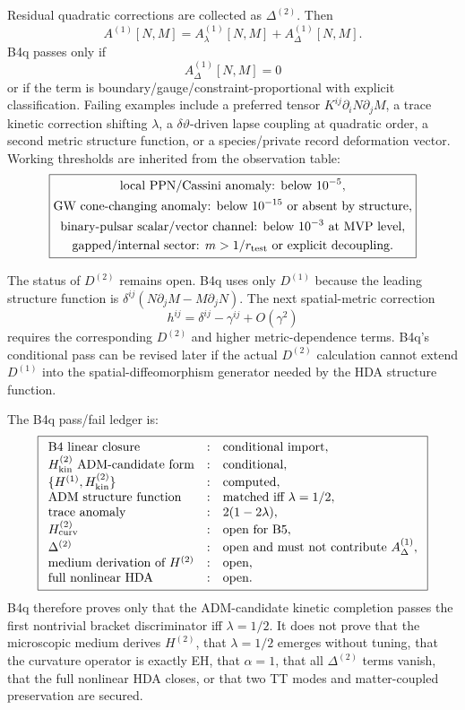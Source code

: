 \documentclass[11pt]{article}
\begin{document}
Residual quadratic corrections are collected as \(\Delta^{(2)}\).  Then
\[
\boxed{
A^{(1)}[N,M]=A_\lambda^{(1)}[N,M]+A_\Delta^{(1)}[N,M].
}
\]
B4q passes only if
\[
\boxed{A_\Delta^{(1)}[N,M]=0}
\]
or if the term is boundary/gauge/constraint-proportional with explicit
classification.  Failing examples include a preferred tensor
\(K^{ij}\partial_iN\partial_jM\), a trace kinetic correction shifting
\(\lambda\), a \(\delta\vartheta\)-driven lapse coupling at quadratic order, a
second metric structure function, or a species/private record deformation
vector.  Working thresholds are inherited from the observation table:
\[
\boxed{
\begin{gathered}
\text{local PPN/Cassini anomaly: below }10^{-5},\\
\text{GW cone-changing anomaly: below }10^{-15}\text{ or absent by structure},\\
\text{binary-pulsar scalar/vector channel: below }10^{-3}\text{ at MVP level},\\
\text{gapped/internal sector: }m>1/r_{\rm test}
\text{ or explicit decoupling.}
\end{gathered}}
\]

The status of \(D^{(2)}\) remains open.  B4q uses only \(D^{(1)}\) because the
leading structure function is \(\delta^{ij}(N\partial_jM-M\partial_jN)\).  The
next spatial-metric correction
\[
\boxed{h^{ij}=\delta^{ij}-\gamma^{ij}+O(\gamma^2)}
\]
requires the corresponding \(D^{(2)}\) and higher metric-dependence terms.
B4q's conditional pass can be revised later if the actual \(D^{(2)}\)
calculation cannot extend \(D^{(1)}\) into the spatial-diffeomorphism generator
needed by the HDA structure function.

The B4q pass/fail ledger is:
\[
\boxed{
\begin{array}{lll}
\text{B4 linear closure} &:& \text{conditional import},\\
H_{\rm kin}^{(2)}\ \text{ADM-candidate form} &:& \text{conditional},\\
\{H^{(1)},H_{\rm kin}^{(2)}\} &:& \text{computed},\\
\text{ADM structure function} &:& \text{matched iff }\lambda=1/2,\\
\text{trace anomaly} &:& 2(1-2\lambda),\\
H_{\rm curv}^{(2)} &:& \text{open for B5},\\
\Delta^{(2)} &:& \text{open and must not contribute }A_\Delta^{(1)},\\
\text{medium derivation of }H^{(2)} &:& \text{open},\\
\text{full nonlinear HDA} &:& \text{open}.
\end{array}}
\]
B4q therefore proves only that the ADM-candidate kinetic completion passes the
first nontrivial bracket discriminator iff \(\lambda=1/2\).  It does not prove
that the microscopic medium derives \(H^{(2)}\), that \(\lambda=1/2\) emerges
without tuning, that the curvature operator is exactly EH, that \(\alpha=1\),
that all \(\Delta^{(2)}\) terms vanish, that the full nonlinear HDA closes, or
that two TT modes and matter-coupled preservation are secured.
\end{document}
